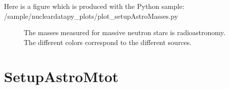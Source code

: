\documentclass[letterpaper,10pt,english]{sphinxmanual}
\begin{document}
\sphinxAtStartPar
Here is a figure which is produced with the Python sample: /sample/nucleardatapy\_plots/plot\_setupAstroMasses.py

\begin{figure}[htbp]
\centering
\capstart

\noindent{}
\caption{The masses measured for massive neutron stars is radio\sphinxhyphen{}astronomy. The different colors correspond to the different sources.}\label{\detokenize{source/api/setup_astro_masses:id1}}\end{figure}

\sphinxstepscope


\section{SetupAstroMtot}
\label{\detokenize{source/api/setup_astro_mtot:setupastromtot}}\label{\detokenize{source/api/setup_astro_mtot::doc}}\label{\detokenize{source/api/setup_astro_mtot:module-nucleardatapy.setup_astro_mtot}}
\end{document}
